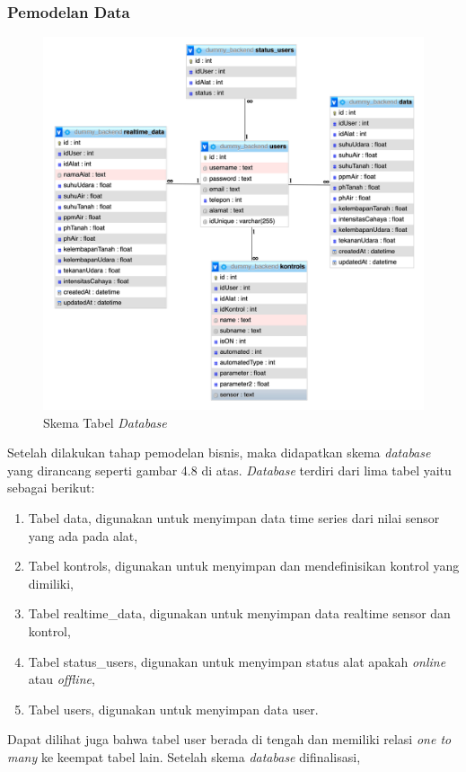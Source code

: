 \begin{flushleft}
\begin{justify}
        \subsubsection{Pemodelan Data}
        \begin{figure}[ht]
            \centering
            \includegraphics[width=12cm]{images/database.png}
            \caption{Skema Tabel \textit{Database}}
        \end{figure}
        \noindent Setelah dilakukan tahap pemodelan bisnis, maka didapatkan skema \emph{database} yang 
        dirancang seperti gambar 4.8 di atas. \emph{Database} terdiri dari lima tabel yaitu sebagai berikut:
        \begin{enumerate}
            \item Tabel data, digunakan untuk menyimpan data time series dari nilai sensor yang ada pada alat, 
            \item Tabel kontrols, digunakan untuk menyimpan dan mendefinisikan kontrol yang dimiliki, 
            \item Tabel realtime\_data, digunakan untuk menyimpan data realtime sensor dan kontrol,
            \item Tabel status\_users, digunakan untuk menyimpan status alat apakah \emph{online} atau \emph{offline},
            \item Tabel users, digunakan untuk menyimpan data user.
        \end{enumerate}
        Dapat dilihat juga bahwa tabel user berada di tengah dan memiliki relasi \emph{one to many} ke keempat tabel lain. Setelah skema \emph{database} difinalisasi, 

\end{justify}
\end{flushleft}
